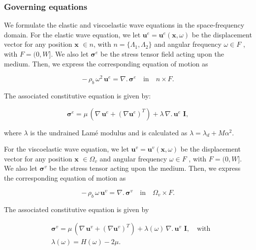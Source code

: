 \documentclass[draft]{agujournal2019}
\begin{document}
\subsubsection{Governing equations}
We formulate the elastic and viscoelastic wave equations in the space-frequency domain. For the elastic wave equation, we let $\bm{u}^e=\bm{u}^e (\bm{x},\omega)$ be the displacement vector for any position $\bm{x}$ $\in n$, with  $n= \{\Lambda_1, \Lambda_2\} $ and angular frequency  $\omega \in F$ , with $F =(0,W]$. We also let $\bm{\sigma}^e$ be the stress tensor field acting upon the medium. Then, we express the corresponding equation of motion as
\begin{linenomath*}
\begin{equation}\label{Eq.13}
- \, \rho_b \,\omega^2 \, \bm{u}^e = \nabla . \, \bm{\sigma}^e \quad  \textrm{in} \quad n \times F.
\end{equation}
\end{linenomath*}
The associated constitutive equation is given by: 
\begin{linenomath*}
\begin{equation}\label{Eq.14}
\bm{\sigma}^e = \mu \,  \left( \nabla \, \bm{u}^e + ({\nabla  \bm{u}^e})^T  \right) + \lambda \,  \nabla . \, \bm{u}^e\,\, \bm{I},
\end{equation}
\end{linenomath*}
where $\lambda$ is the undrained Lamé modulus and is calculated as $\lambda = \lambda_d + M \alpha^2$.

For the viscoelastic wave equation, we let $\bm{u}^v=\bm{u}^v (\bm{x},\omega)$ be the displacement vector for any position $\bm{x}$  $ \in \Omega_v$ and angular frequency $\omega \in F$ , with $F =(0,W]$. We also let $\bm{\sigma}^v$ be the stress tensor acting upon the medium. Then, we express the corresponding equation of motion as
\begin{linenomath*}
\begin{equation}\label{Eq.15}
- \, \rho_b \,\omega \, \bm{u}^v = \nabla . \, \bm{\sigma}^v \quad \textrm{in} \quad \Omega_v \times F.
\end{equation}
\end{linenomath*}
The associated constitutive equation is given by
\begin{linenomath*}
\begin{equation}\label{Eq.16}
\begin{split}
& \bm{\sigma}^v = \mu \,  \left( \nabla \, \bm{u}^v + ({\nabla  \bm{u}^v})^T  \right) + \lambda(\omega) \,  \nabla . \, \bm{u}^v\,\, \bm{I}, \quad \text{with} \\
& \lambda(\omega)= H(\omega)-2\mu.
\end{split}
\end{equation}
\end{linenomath*}
\end{document}
